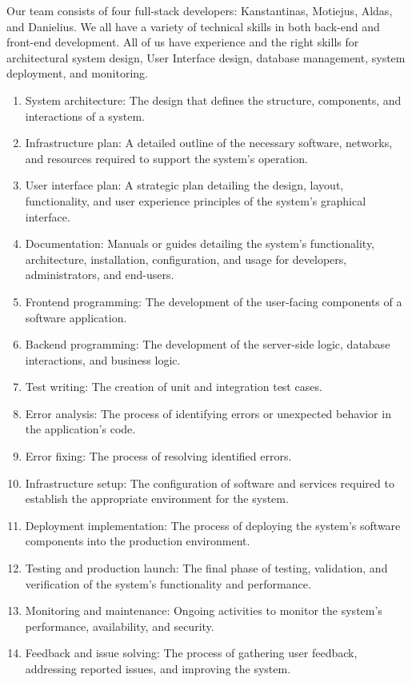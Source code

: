 \documentclass[
    english, %
]{VUMIFPSkursinis}
\begin{document}
Our team consists of four full-stack developers: Kanstantinas, Motiejus, Aldas, and Danielius. We all have a variety of technical skills in both back-end and front-end development. All of us have experience and the right skills for architectural system design, User Interface design, database management, system deployment, and monitoring.

\begin{enumerate}[label=\arabic*.]
    \item System architecture: The design that defines the structure, components, and interactions of a system.
    \item Infrastructure plan: A detailed outline of the necessary software, networks, and resources required to support the system's operation.
    \item User interface plan: A strategic plan detailing the design, layout, functionality, and user experience principles of the system's graphical interface.
    \item Documentation: Manuals or guides detailing the system's functionality, architecture, installation, configuration, and usage for developers, administrators, and end-users.
    \item Frontend programming: The development of the user-facing components of a software application.
    \item Backend programming: The development of the server-side logic, database interactions, and business logic.
    \item Test writing: The creation of unit and integration test cases.
    \item Error analysis: The process of identifying errors or unexpected behavior in the application’s code.
    \item Error fixing: The process of resolving identified errors.
    \item Infrastructure setup: The configuration of software and services required to establish the appropriate environment for the system.
    \item Deployment implementation: The process of deploying the system's software components into the production environment.
    \item Testing and production launch: The final phase of testing, validation, and verification of the system's functionality and performance.
    \item Monitoring and maintenance: Ongoing activities to monitor the system's performance, availability, and security. 
    \item Feedback and issue solving: The process of gathering user feedback, addressing reported issues, and improving the system.
\end{enumerate}
\end{document}
